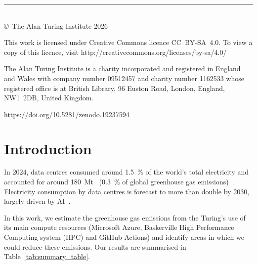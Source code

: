 \documentclass[12pt]{article}
\newlength{\turingcolwd}
\newlength{\turingcolht}
\newcommand{\reportAcknowledgment}{}
\newcommand{\reportCopyrightDate}{2026}
\newcommand{\reportDOI}{10.5281/zenodo.19237594}
\newcommand{\cooe}{\ensuremath{\mathrm{CO}_2\mathrm{e}}}
\newcommand{\mtcooe}[1]{\qty[qualifier-mode=combine]{#1}{\mega\tonne\of{\cooe}}}
\begin{document}
  \begin{titlepage}
  \raggedright\setlength{\parindent}{0pt}%
  \vspace*{5\turingcolht}
  \fontsize{8}{9.2}\selectfont\raggedright%
  \fontsize{8}{11}\selectfont
  {\offinterlineskip\rule{9\turingcolwd}{0.15ex}\\[0.5ex]
  \copyright\ The Alan Turing Institute \reportCopyrightDate\par}
  \medskip
  \reportAcknowledgment\relax%
  This work is licensed under Creative Commons licence CC~BY-SA~4.0. To
  view a copy of this licence, visit
  http://creativecommons.org/licenses/by-sa/4.0/ \medskip

  The Alan Turing Institute is a charity incorporated and registered in
  England and Wales with company number 09512457 and charity number
  1162533 whose registered office is at British Library, 96 Euston Road,
  London, England, NW1~2DB, United Kingdom.
  \medskip

  https://doi.org/\reportDOI
  \end{titlepage}
\endgroup
\restoregeometry


\section{Introduction}
\label{sec:intro}

In 2024, data centres consumed around \qty{1.5}{\percent} of the world’s total electricity and accounted for around \mtcooe{180} (\qty{0.3}{\percent} of global greenhouse gas emissions)~\cite{iea_energy_ai,unep_egr_2025}. Electricity consumption by data centres is forecast to more than double by 2030, largely driven by AI~\cite{iea_energy_ai}.

In this work, we estimate the greenhouse gas emissions from the Turing's use of its main compute resources (Microsoft Azure, Baskerville High Performance Computing system (HPC) and GitHub Actions) and identify areas in which we could reduce these emissions. Our results are summarised in Table~\ref{tab:summary_table}.
\end{document}
